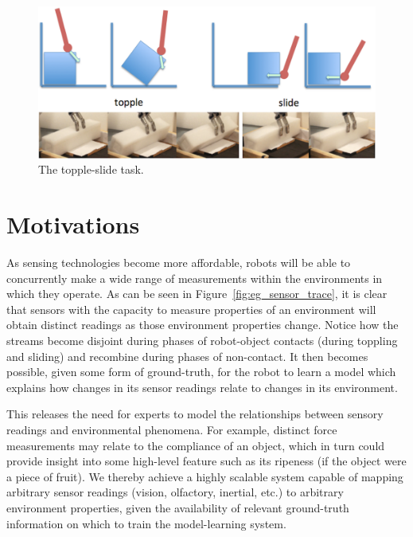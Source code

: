 \begin{figure}[]
	\centering
	\includegraphics[width=\linewidth]{images/topple}
	\caption{The topple-slide task.}
	\label{fig:topple}
\end{figure}


\section{Motivations}
As sensing technologies become more affordable, robots will be able to concurrently make a wide range of measurements within the environments in which they operate.  
As can be seen in Figure~\ref{fig:eg_sensor_trace}, it is clear that sensors with the capacity to measure properties of an environment will obtain distinct readings as those environment properties change. 
Notice how the streams become disjoint during phases of robot-object contacts (during toppling and sliding) and recombine during phases of non-contact.
It then becomes possible, given some form of ground-truth, for the robot to learn a model which explains how changes in its sensor readings relate to changes in its environment.


This releases the need for experts to model the relationships between sensory readings and environmental phenomena. 
For example, distinct force measurements may relate to the compliance of an object, which in turn could provide insight into some high-level feature such as its ripeness (if the object were a piece of fruit).
We thereby achieve a highly scalable system capable of mapping arbitrary sensor readings (vision, olfactory, inertial, etc.) to arbitrary environment properties, given the availability of relevant ground-truth information on which to train the model-learning system.

